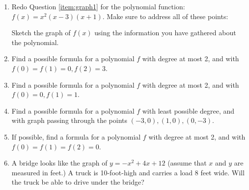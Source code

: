 \documentclass[12pt,dvipsnames]{article}
\begin{document}
\begin{enumerate}[label=\arabic*., leftmargin=2\parindent,
labelindent=\parindent, labelsep=*]
\item Redo Question \ref{item:graph1} for the polynomial function: $\displaystyle f(x)=x^2(x-3)(x+1)$. Make sure to address all of these points: 
Sketch the graph of $f(x)$ using the information you have gathered about the polynomial.%

\item Find a possible formula for a polynomial $f$ with degree at most 2, and with $f(0)=f(1)=0, f(2)=3$.

\item Find a possible formula for a polynomial $f$ with degree at most 2, and with $f(0)=0, f(1)=1$.

\item Find a possible formula for a polynomial $f$ with least possible degree, and with graph passing through the points $(-3,0),(1,0),(0,-3)$.

\item If  possible, find a  formula for a polynomial $f$ with degree at most 2, and with $f(0)=f(1)=f(2)=0$.
\item A bridge looks like the graph of $\displaystyle y=-x^2+4x+12$ (assume that $x$ and $y$ are measured in feet.) A truck is 10-foot-high  and carries a load 8 feet wide. Will the truck be able to drive under the bridge?




\end{enumerate}
\end{document}
